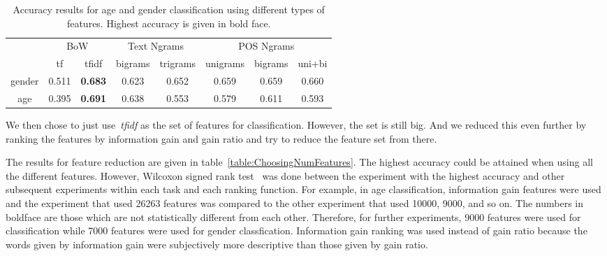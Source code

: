 \documentclass[a4paper]{llncs}
\begin{document}

\begin{table}[]
\centering
\begin{tabular}{|l|cc|cc|ccc|}
\hline
\multirow{2}{*}{}            & \multicolumn{2}{c|}{BoW} & \multicolumn{2}{c|}{Text Ngrams} & \multicolumn{3}{c|}{POS Ngrams} \\ %
                             & tf     & tfidf           & bigrams        & trigrams        & unigrams   & bigrams  & uni+bi  \\ \hline
\multicolumn{1}{|c|}{gender} & 0.511  & \textbf{0.683}  & 0.623          & 0.652           & 0.659      & 0.659    & 0.660   \\ %
\multicolumn{1}{|c|}{age}    & 0.395  & \textbf{0.691}  & 0.638          & 0.553           & 0.579      & 0.611    & 0.593   \\ \hline
\end{tabular}
\caption{Accuracy results for age and gender classification using different types of features. Highest accuracy is given in bold face.}
\label{table:DiffFeaturesResults}
\end{table}

We then chose to just use~\textit{tfidf} as the set of features for classification. However, the set is still big. And we reduced this even further by ranking the features by information gain and gain ratio and try to reduce the feature set from there.  

The results for feature reduction are given in table~\ref{table:ChoosingNumFeatures}. The highest accuracy could be attained when using all the different features. However, Wilcoxon signed rank test~\cite{wilcoxon1945individual} was done between the experiment with the highest accuracy and other subsequent experiments within each task and each ranking function. For example, in age classification, information gain features were used and the experiment that used 26263 features was compared to the other experiment that used 10000, 9000, and so on. The numbers in boldface are those which are not statistically different from each other. Therefore, for further experiments, 9000 features were used for classification while 7000 features were used for gender classfication. Information gain ranking was used instead of gain ratio because the words given by information gain were subjectively more descriptive than those given by gain ratio. 
\end{document}
